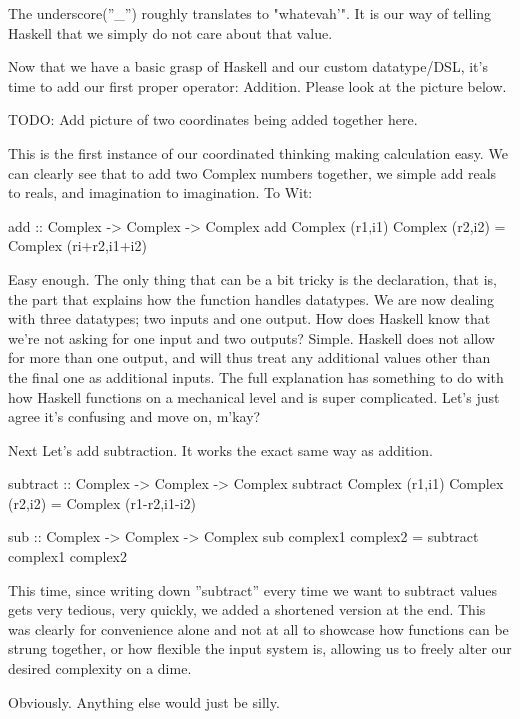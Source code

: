The underscore(''\_'') roughly translates to "whatevah'". It is our way of telling Haskell that we simply do not care about that value.


Now that we have a basic grasp of Haskell and our custom datatype/DSL, it's time to add our first proper operator: Addition. Please look at the picture below.

TODO: Add picture of two coordinates being added together here.

This is the first instance of our coordinated thinking making calculation easy. We can clearly see that to add two Complex numbers together, we simple add reals to reals, and imagination to imagination. To Wit:
\begin{code}
add :: Complex -> Complex -> Complex
add Complex (r1,i1) Complex (r2,i2) = Complex (ri+r2,i1+i2)
\end{code}
Easy enough. The only thing that can be a bit tricky is the declaration, that is, the part that explains how the function handles datatypes. We are now dealing with three datatypes; two inputs and one output. How does Haskell know that we're not asking for one input and two outputs? Simple. Haskell does not allow for more than one output, and will thus treat any additional values other than the final one as additional inputs. The full explanation has something to do with how Haskell functions on a mechanical level and is super complicated. Let's just agree it's confusing and move on, m'kay?

Next Let's add subtraction. It works the exact same way as addition.
\begin{code}
subtract :: Complex -> Complex -> Complex
subtract Complex (r1,i1) Complex (r2,i2) = Complex (r1-r2,i1-i2)

sub :: Complex -> Complex -> Complex
sub complex1 complex2 = subtract complex1 complex2
\end{code}
This time, since writing down ''subtract'' every time we want to subtract values gets very tedious, very quickly, we added a shortened version at the end. This was clearly for convenience alone and not at all to showcase how functions can be strung together, or how flexible the input system is, allowing us to freely alter our desired complexity on a dime.

Obviously. Anything else would just be silly.



